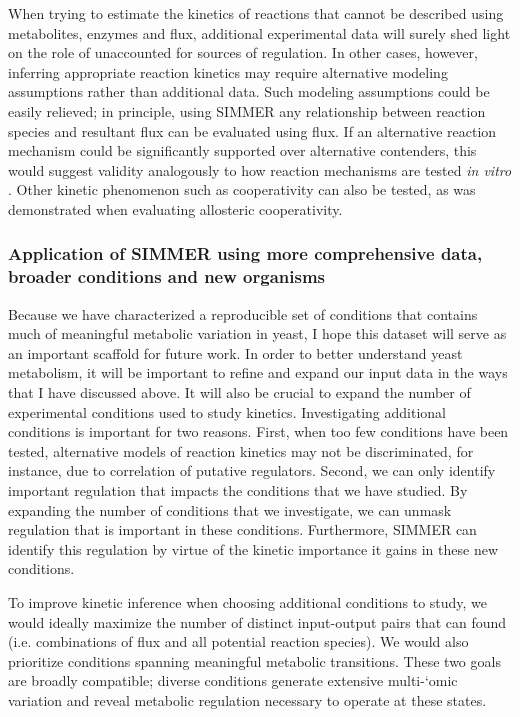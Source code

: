 When trying to estimate the kinetics of reactions that cannot be described using metabolites, enzymes and flux, additional experimental data will surely shed light on the role of unaccounted for sources of regulation. In other cases, however, inferring appropriate reaction kinetics may require alternative modeling assumptions rather than additional data. Such modeling assumptions could be easily relieved; in principle, using SIMMER any relationship between reaction species and resultant flux can be evaluated using flux. If an alternative reaction mechanism could be significantly supported over alternative contenders, this would suggest validity analogously to how reaction mechanisms are tested \textit{in vitro} \cite{CornishBowden:2012wb}. Other kinetic phenomenon such as cooperativity \cite{Hill:1910vo, Bush:2012jf} can also be tested, as was demonstrated when evaluating allosteric cooperativity.

\subsubsection{Application of SIMMER using more comprehensive data, broader conditions and new organisms}

Because we have characterized a reproducible set of conditions that contains much of meaningful metabolic variation in yeast, I hope this dataset will serve as an important scaffold for future work. In order to better understand yeast metabolism, it will be important to refine and expand our input data in the ways that I have discussed above. It will also be crucial to expand the number of experimental conditions used to study kinetics. Investigating additional conditions is important for two reasons. First, when too few conditions have been tested, alternative models of reaction kinetics may not be discriminated, for instance, due to correlation of putative regulators. Second, we can only identify important regulation that impacts the conditions that we have studied. By expanding the number of conditions that we investigate, we can unmask regulation that is important in these conditions. Furthermore, SIMMER can identify this regulation by virtue of the kinetic importance it gains in these new conditions.

To improve kinetic inference when choosing additional conditions to study, we would ideally maximize the number of distinct input-output pairs that can found (i.e. combinations of flux and all potential reaction species). We would also prioritize conditions spanning meaningful metabolic transitions. These two goals are broadly compatible; diverse conditions generate extensive multi-`omic variation and reveal metabolic regulation necessary to operate at these states.

